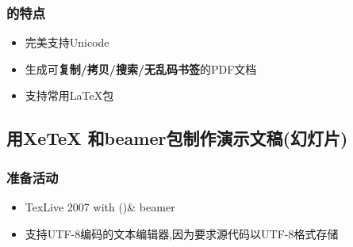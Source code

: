 \documentclass[notheorems,mathserif,table,compress]{beamer}  %
\begin{document}
\begin{frame}
  \frametitle{\XeTeX 的特点}
  \begin{itemize}
  \item 完美支持Unicode
  \item 生成可\textbf{复制/拷贝/搜索/无乱码书签}的PDF文档
  \item 支持常用\LaTeX 包
  \end{itemize}
\end{frame}

\subsection{用XeTeX 和beamer包制作演示文稿(幻灯片)}
\begin{frame}
  \frametitle{准备活动}
  \begin{itemize}
  \item TexLive 2007 with \XeTeX (\the\XeTeXversion\XeTeXrevision)\& beamer
  \item 支持UTF-8编码的文本编辑器,因为\XeTeX 要求源代码以UTF-8格式存储
  \end{itemize}
\end{frame}
\end{document}
